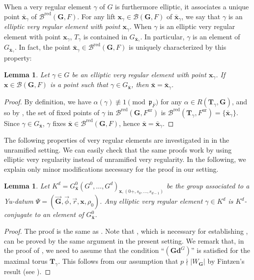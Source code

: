 \documentclass{amsart}
\newcommand{\red}{\mathrm{red}}
\newcommand{\ur}{\mathrm{ur}}
\newcommand{\ol}{\overline}
\newcommand{\bfT}{\mathbf{T}}
\newcommand{\x}{\mathbf{x}}
\newcommand{\bfG}{\mathbf{G}}
\newcommand{\cB}{\mathcal{B}}
\theoremstyle{plain}
\newtheorem{lem}[thm]{Lemma}
\theoremstyle{definition}
\theoremstyle{remark}
\theoremstyle{theorem}
\begin{document}
When a very regular element $\gamma$ of $G$ is furthermore elliptic, it associates a unique point $\bar{\x}_{\gamma}$ of $\mathcal{B}^{\red}(\bfG,F)$.
For any lift $\x_{\gamma}\in\mathcal{B}(\bfG,F)$ of $\bar{\x}_{\gamma}$, we say that $\gamma$ is an \textit{elliptic very regular element with point $\x_{\gamma}$}.
When $\gamma$ is an elliptic very regular element with point $\x_{\gamma}$, $T_{\gamma}$ is contained in $G_{\bar{\x}_{\gamma}}$.
In particular, $\gamma$ is an element of $G_{\bar{\x}_{\gamma}}$.
In fact, the point $\bar{\x}_{\gamma}\in\mathcal{B}^{\red}(\bfG,F)$ is uniquely characterized by this property:

\begin{lem}\label{lem:point}
Let $\gamma\in G$ be an elliptic very regular element with point $\x_{\gamma}$.
If $\x\in\mathcal{B}(\bfG,F)$ is a point such that $\gamma\in G_{\bar{\x}}$, then $\bar{\x}=\bar{\x}_{\gamma}$.
\end{lem}

\begin{proof}
By definition, we have $\alpha(\gamma) \not\equiv 1 \pmod{\mathfrak{p}_{\ol{F}}}$ for any $\alpha \in R(\bfT_{\gamma}, \bfG)$, and so by \cite[Section 3.6]{Tit79}, the set of fixed points of $\gamma$ in $\cB^{\red}(\bfG, F^{\ur})$ is $\cB^{\red}(\bfT_\gamma, F^{\ur})=\{\bar{\x}_{\gamma}\}$.
Since $\gamma\in G_{\bar{\x}}$, $\gamma$ fixes $\bar{\x}\in\cB^{\red}(\bfG,F)$, hence $\bar{\x}=\bar{\x}_{\gamma}$.
\end{proof}

The following properties of very regular elements are investigated in \cite{CO21} in the unramified setting.
We can easily check that the same proofs work by using elliptic very regularity instead of unramified very regularity.
In the following, we explain only minor modifications necessary for the proof in our setting.

\begin{lem}\label{lem:CO21-4.7}
Let $K^{d}=G^{0}_{\bar{\x}}(G^{0},\ldots,G^{d})_{\x,(0+,s_{0},\ldots,s_{d-1})}$ be the group associated to a Yu-datum $\Psi=(\vec{\bfG},\vec{\phi},\vec{r},\x,\rho_{0})$.
Any elliptic very regular element $\gamma\in K^{d}$ is $K^{d}$-conjugate to an element of $G^{0}_{\bar{\x}}$.
\end{lem}

\begin{proof}
The proof is the same as \cite[Lemma 4.7]{CO21}.
Note that \cite[Lemma 4.3]{CO21}, which is necessary for establishing \cite[Lemma 4.7]{CO21}, can be proved by the same argument in the present setting.
We remark that, in the proof of \cite[Lemma 4.3]{CO21}, we need to assume that the condition ``$(\mathbf{Gd}^{G})$'' is satisfied for the maximal torus $\bfT_{\gamma}$.
This follows from our assumption that $p\nmid|W_{\bfG}|$ by Fintzen's result \cite{Fin21-IMRN} (see \cite[Remark 4.4 (1)]{CO21}).
\end{proof}
\end{document}
